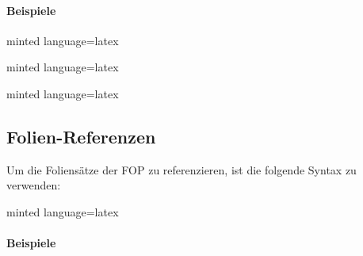 \documentclass[
    titleprefix=AlgoTeX,
    inlineshortcut=java,
    corporatedesign,
    boxarc,
]{algoexercise}
\begin{document}
    \paragraph{Beispiele}\mbox{}

    \begin{minipage}{0.3\textwidth}
    \end{minipage}%
    \begin{minipage}{.7\textwidth}
        \begin{codeBlock}[]{minted language=latex}
        \end{codeBlock}
    \end{minipage}

    \begin{minipage}{0.3\textwidth}
    \end{minipage}%
    \begin{minipage}{.7\textwidth}
        \begin{codeBlock}[]{minted language=latex}
        \end{codeBlock}
    \end{minipage}

    \begin{minipage}{0.3\textwidth}
    \end{minipage}%
    \begin{minipage}{.7\textwidth}
        \begin{codeBlock}[]{minted language=latex}
        \end{codeBlock}
    \end{minipage}

    \subsection{Folien-Referenzen}
    Um die Foliensätze der FOP zu referenzieren, ist die folgende Syntax zu verwenden:
    \begin{codeBlock}[]{minted language=latex}
    \end{codeBlock}

    \paragraph{Beispiele}\mbox{}
\end{document}
